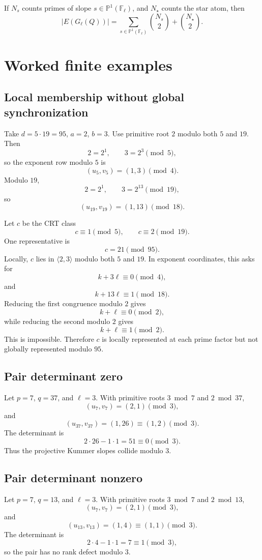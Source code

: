 \documentclass[11pt]{article}
\newcommand{\F}{\mathbb F}
\newcommand{\1}{\mathbf 1}
\begin{document}
If \(N_s\) counts primes of slope \(s\in\mathbb P^1(\F_\ell)\), and \(N_\star\) counts the star atom, then
\[
|E(G_\ell(Q))|=
\sum_{s\in\mathbb P^1(\F_\ell)}\binom{N_s}{2}
+
\binom{N_\star}{2}.
\]



\section{Worked finite examples}

\subsection{Local membership without global synchronization}

Take \(d=5\cdot19=95\), \(a=2\), \(b=3\).  Use primitive root \(2\) modulo both \(5\) and \(19\).  Then
\[
2=2^1,\qquad 3=2^3\pmod5,
\]
so the exponent row modulo \(5\) is
\[
(u_5,v_5)=(1,3)\pmod4.
\]
Modulo \(19\),
\[
2=2^1,\qquad 3=2^{13}\pmod{19},
\]
so
\[
(u_{19},v_{19})=(1,13)\pmod{18}.
\]

Let \(c\) be the CRT class
\[
c\equiv1\pmod5,\qquad c\equiv2\pmod{19}.
\]
One representative is
\[
c=21\pmod{95}.
\]
Locally, \(c\) lies in \(\langle2,3\rangle\) modulo both \(5\) and \(19\).  In exponent coordinates, this asks for
\[
k+3\ell\equiv0\pmod4,
\]
and
\[
k+13\ell\equiv1\pmod{18}.
\]
Reducing the first congruence modulo \(2\) gives
\[
k+\ell\equiv0\pmod2,
\]
while reducing the second modulo \(2\) gives
\[
k+\ell\equiv1\pmod2.
\]
This is impossible.  Therefore \(c\) is locally represented at each prime factor but not globally represented modulo \(95\).

\subsection{Pair determinant zero}

Let \(p=7\), \(q=37\), and \(\ell=3\).  With primitive roots \(3\bmod7\) and \(2\bmod37\),
\[
(u_7,v_7)=(2,1)\pmod3,
\]
and
\[
(u_{37},v_{37})=(1,26)\equiv(1,2)\pmod3.
\]
The determinant is
\[
2\cdot26-1\cdot1=51\equiv0\pmod3.
\]
Thus the projective Kummer slopes collide modulo \(3\).

\subsection{Pair determinant nonzero}

Let \(p=7\), \(q=13\), and \(\ell=3\).  With primitive roots \(3\bmod7\) and \(2\bmod13\),
\[
(u_7,v_7)=(2,1)\pmod3,
\]
and
\[
(u_{13},v_{13})=(1,4)\equiv(1,1)\pmod3.
\]
The determinant is
\[
2\cdot4-1\cdot1=7\equiv1\pmod3,
\]
so the pair has no rank defect modulo \(3\).
\end{document}

